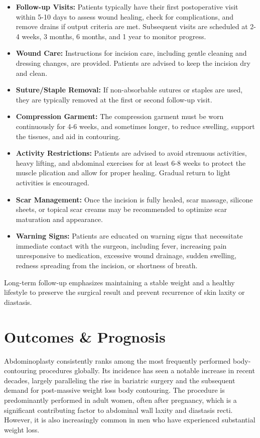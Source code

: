 \begin{itemize}
  \item \textbf{Follow-up Visits:} Patients typically have their first postoperative visit within 5-10 days to assess wound healing, check for complications, and remove drains if output criteria are met. Subsequent visits are scheduled at 2-4 weeks, 3 months, 6 months, and 1 year to monitor progress.
  \item \textbf{Wound Care:} Instructions for incision care, including gentle cleaning and dressing changes, are provided. Patients are advised to keep the incision dry and clean.
  \item \textbf{Suture/Staple Removal:} If non-absorbable sutures or staples are used, they are typically removed at the first or second follow-up visit.
  \item \textbf{Compression Garment:} The compression garment must be worn continuously for 4-6 weeks, and sometimes longer, to reduce swelling, support the tissues, and aid in contouring.
  \item \textbf{Activity Restrictions:} Patients are advised to avoid strenuous activities, heavy lifting, and abdominal exercises for at least 6-8 weeks to protect the muscle plication and allow for proper healing. Gradual return to light activities is encouraged.
  \item \textbf{Scar Management:} Once the incision is fully healed, scar massage, silicone sheets, or topical scar creams may be recommended to optimize scar maturation and appearance.
  \item \textbf{Warning Signs:} Patients are educated on warning signs that necessitate immediate contact with the surgeon, including fever, increasing pain unresponsive to medication, excessive wound drainage, sudden swelling, redness spreading from the incision, or shortness of breath.
\end{itemize}
Long-term follow-up emphasizes maintaining a stable weight and a healthy lifestyle to preserve the surgical result and prevent recurrence of skin laxity or diastasis.

\section*{Outcomes \& Prognosis}
Abdominoplasty consistently ranks among the most frequently performed body-contouring procedures globally. Its incidence has seen a notable increase in recent decades, largely paralleling the rise in bariatric surgery and the subsequent demand for post-massive weight loss body contouring. The procedure is predominantly performed in adult women, often after pregnancy, which is a significant contributing factor to abdominal wall laxity and diastasis recti. However, it is also increasingly common in men who have experienced substantial weight loss.

